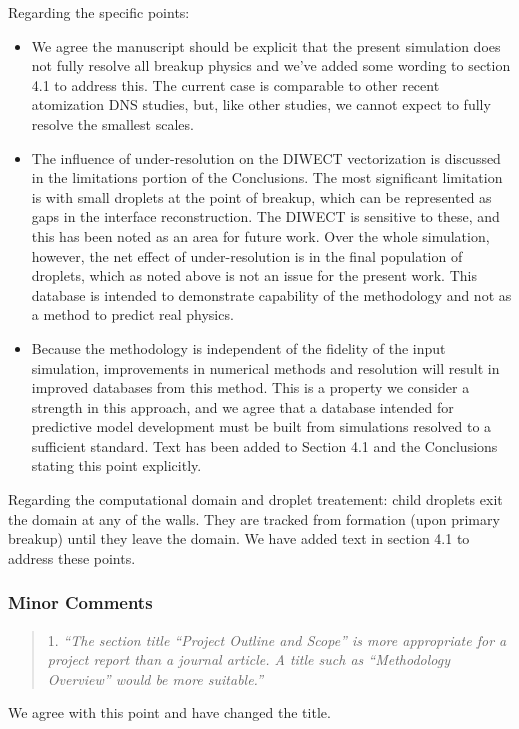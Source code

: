 \documentclass[11pt]{article}
\begin{document}
Regarding the specific points:
\begin{itemize}
    \item We agree the manuscript should be explicit that the present simulation does not fully resolve all breakup physics and we've added some wording to section 4.1 to address this. The current case is comparable to other recent atomization DNS studies, but, like other studies, we cannot expect to fully resolve the smallest scales.
    \item The influence of under-resolution on the DIWECT vectorization is discussed in the limitations portion of the Conclusions. The most significant limitation is with small droplets at the point of breakup, which can be represented as gaps in the interface reconstruction. The DIWECT is sensitive to these, and this has been noted as an area for future work. Over the whole simulation, however, the net effect of under-resolution is in the final population of droplets, which as noted above is not an issue for the present work. This database is intended to demonstrate capability of the methodology and not as a method to predict real physics.
    \item Because the methodology is independent of the fidelity of the input simulation, improvements in numerical methods and resolution will result in improved databases from this method. This is a property we consider a strength in this approach, and we agree that a database intended for predictive model development must be built from simulations resolved to a sufficient standard. Text has been added to Section 4.1 and the Conclusions stating this point explicitly.
\end{itemize}

Regarding the computational domain and droplet treatement: child droplets exit the domain at any of the walls. They are tracked from formation (upon primary breakup) until they leave the domain. We have added text in section 4.1 to address these points.

\subsubsection*{Minor Comments}
\begin{quote}
    {1. \it``The section title “Project Outline and Scope” is more appropriate for a project report than a journal article. A title such as “Methodology Overview” would be more suitable.''}
\end{quote}

We agree with this point and have changed the title.
\end{document}
